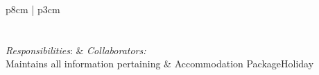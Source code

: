 \begin{center}
\renewcommand{\arraystretch}{1.5}
\begin{tabu}{p{8cm} | p{3cm}}
	 \\
	\toprule
	 \\
	\midrule
	 \\
	\midrule
	\emph{Responsibilities}: & \emph{Collaborators:} \\
	\midrule
	Maintains all information pertaining &
		Accommodation \newline
		PackageHoliday \\
	\bottomrule
\end{tabu}
\end{center}

